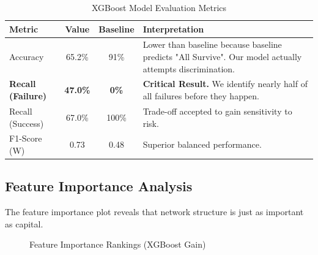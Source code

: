 \documentclass[11pt, a4paper]{article}
\begin{document}
\begin{table}[H]
    \centering
    \caption{XGBoost Model Evaluation Metrics}
    \label{tab:results}
    \begin{tabular}{@{}lccp{5cm}@{}}
        \toprule
        \textbf{Metric} & \textbf{Value} & \textbf{Baseline} & \textbf{Interpretation} \\ \midrule
        Accuracy & 65.2\% & 91\% & Lower than baseline because baseline predicts "All Survive". Our model actually attempts discrimination. \\
        \rowcolor{green!10} \textbf{Recall (Failure)} & \textbf{47.0\%} & \textbf{0\%} & \textbf{Critical Result.} We identify nearly half of all failures before they happen. \\
        Recall (Success) & 67.0\% & 100\% & Trade-off accepted to gain sensitivity to risk. \\
        F1-Score (W) & 0.73 & 0.48 & Superior balanced performance. \\ \bottomrule
    \end{tabular}
\end{table}

\subsection{Feature Importance Analysis}
The feature importance plot reveals that network structure is just as important as capital.

\begin{figure}[H]
    \centering
    \caption{Feature Importance Rankings (XGBoost Gain)}
    \label{fig:importance}
\end{figure}
\end{document}
